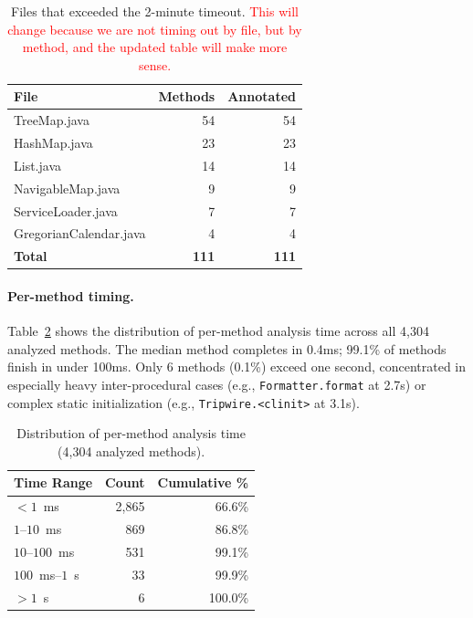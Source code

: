 \begin{table}[h]
\centering
\caption{Files that exceeded the 2-minute timeout. \textcolor{red}{This will change because we are not timing out by file, but by method, and the updated table will make more sense.}}
\label{tab:timeouts}
\begin{tabular}{lrr}
\toprule
\textbf{File} & \textbf{Methods} & \textbf{Annotated} \\
\midrule
TreeMap.java            & 54 & 54 \\
HashMap.java            & 23 & 23 \\
List.java               & 14 & 14 \\
NavigableMap.java       &  9 &  9 \\
ServiceLoader.java      &  7 &  7 \\
GregorianCalendar.java  &  4 &  4 \\
\midrule
\textbf{Total}          & \textbf{111} & \textbf{111} \\
\bottomrule
\end{tabular}
\end{table}

\paragraph{Per-method timing.}
Table~\ref{tab:method-timing} shows the distribution of per-method analysis time across all 4,304 analyzed methods.
The median method completes in 0.4ms; 99.1\% of methods finish in under 100ms.
Only 6 methods (0.1\%) exceed one second, concentrated in especially heavy inter-procedural cases (e.g., \texttt{Formatter.format} at 2.7s) or complex static initialization (e.g., \texttt{Tripwire.<clinit>} at 3.1s).

\begin{table}[h]
\centering
\caption{Distribution of per-method analysis time (4,304 analyzed methods).}
\label{tab:method-timing}
\begin{tabular}{lrr}
\toprule
\textbf{Time Range} & \textbf{Count} & \textbf{Cumulative \%} \\
\midrule
$< 1$~ms          & 2,865 & 66.6\% \\
$1$--$10$~ms      &   869 & 86.8\% \\
$10$--$100$~ms    &   531 & 99.1\% \\
$100$~ms--$1$~s   &    33 & 99.9\% \\
$> 1$~s           &     6 & 100.0\% \\
\bottomrule
\end{tabular}
\end{table}

